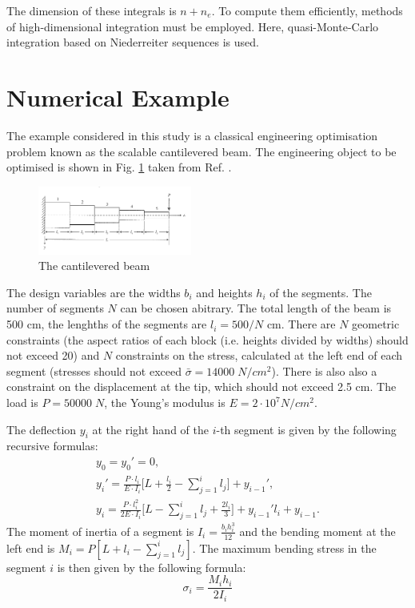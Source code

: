 \documentclass[10pt,twocolumn,a4paper]{article}
\begin{document}
The dimension of these integrals is $n+n_e$. To compute them efficiently, methods of high-dimensional integration must be employed. Here, quasi-Monte-Carlo integration\cite{Caflisch1998} based on Niederreiter sequences\cite{Niederreiter1992} is used.

\section{Numerical Example}
\label{sec:num_example}

The example considered in this study is a classical engineering optimisation problem known as the scalable cantilevered beam\cite{Vanderpllaats2001}. The engineering object to be optimised is shown in Fig. \ref{fig:beam} taken from Ref. \cite{Vanderpllaats2001}.

\begin{figure}[ht]
    \centering
    \includegraphics[width=0.45\textwidth]{images/beam.png}
    \caption{The cantilevered beam}
    \label{fig:beam}
\end{figure}

The design variables are the widths $b_i$ and heights $h_i$ of the segments. The number of segments $N$ can be chosen abitrary. The total length of the beam is 500 cm, the lenghths of the segments are $l_i=500/N$  cm. There are $N$ geometric constraints (the aspect ratios of each block (i.e. heights divided by widths) should not exceed 20) and $N$ constraints on the stress, calculated at the left end of each segment (stresses should not exceed  $\bar{\sigma}=14000\; N/cm^2$). There is also also a constraint on the displacement at the tip, which should not exceed 2.5 cm. The load is $P = 50 000\; N$, the Young's modulus is $E=2\cdot 10^7  N/cm^2$.

The deflection $y_i$ at the right hand of the $i$-th segment is given by the following recursive formulas:
\begin{displaymath}
  \begin{array}{c}
    y_0=y_0'=0, \\
    y_i'=\frac{P\cdot l_i}{E\cdot I_i}\Big[ L+\frac{l_i}{2}-\sum\limits_{j=1}^i l_j\Big]+y_{i-1}', \\
    y_i=\frac{P\cdot l_i^2}{2E\cdot I_i}\Big[L-\sum\limits_{j=1}^i l_j + \frac{2l_i}{3}\Big]+y_{i-1}'l_i+y_{i-1}.
  \end{array}
\end{displaymath}
The moment of inertia of a segment is $I_i=\frac{b_i h_i^3}{12}$ and the bending moment at the left end is $M_i=P[L+l_i- \sum_{j=1}^{i}  l_j ]$. The maximum bending stress in the segment $i$ is then given by the following formula:
\begin{displaymath}
  \sigma_i=\frac{M_i h_i}{2I_i}
\end{displaymath}
\end{document}
